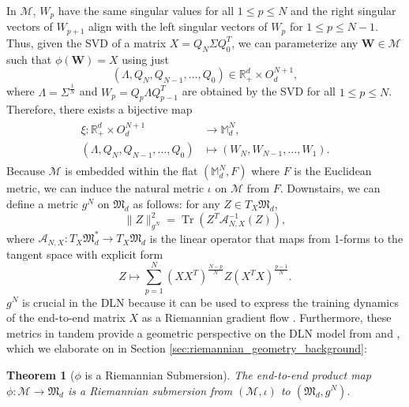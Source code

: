 \documentclass{amsart}
\DeclareMathOperator{\Tr}{Tr}
\newtheorem{theorem}{Theorem}[section]
\theoremstyle{definition}
\theoremstyle{remark}
\numberwithin{equation}{section}
\begin{document}
In $\mathcal{M}$, $W_p$ have the same singular values for all $1 \leq p \leq N$ and the right singular vectors of $W_{p+1}$ align with the left singular vectors of $W_{p}$ for $1 \leq p \leq N-1$. Thus, given the SVD of a matrix $X = Q_N\Sigma Q_0^T$, we can parameterize any $\mathbf{W} \in \mathcal{M}$ such that $\phi(\mathbf{W}) = X$ using just 
\begin{equation}
    (\Lambda, Q_N, Q_{N-1}, \ldots, Q_0) \in \mathbb{R}_+^d\times O_d^{N + 1},
\end{equation}
where $\Lambda = \Sigma^\frac{1}{N}$ and $W_p = Q_{p}\Lambda Q_{p-1}^T$ are obtained by the SVD for all $1 \leq p \leq N$. Therefore, there exists a bijective map 
\begin{align}\label{eq:xi_parameterization}
\begin{split}
    \xi: \mathbb{R}^d_{+} \times O_d^{N+1} &\to \mathbb{M}_d^N, \\
    (\Lambda, Q_N, Q_{N-1}, \ldots, Q_{0}) &\mapsto (W_N, W_{N-1}, \ldots, W_1).
\end{split}
\end{align}
Because $\mathcal{M}$ is embedded within the flat $(\mathbb{M}_d^N,F)$ where $F$ is the Euclidean metric, we can induce the natural metric $\iota$ on $\mathcal{M}$ from $F$. Downstairs, we can define a metric $g^N$ on $\mathfrak{M}_d$ as follows: for any $Z \in T_X\mathfrak{M}_d$,
\begin{equation}
    \|Z\|_{g^N}^2 = \Tr\left(Z^T\mathcal{A}_{N,X}^{-1}(Z)\right),
\end{equation}
where $\mathcal{A}_{N,X}: T_X\mathfrak{M}_d^* \to T_X\mathfrak{M}_d$ is the linear operator that maps from 1-forms to the tangent space with explicit form
\begin{equation}
    Z \mapsto \sum_{p=1}^N\left(XX^T\right)^\frac{N-p}{N}Z\left(X^TX\right)^\frac{p-1}{N}.
\end{equation}
$g^N$ is crucial in the DLN because it can be used to express the training dynamics of the end-to-end matrix $X$ as a Riemannian gradient flow \cite[Section 4]{bah2022learning}. Furthermore, these metrics in tandem provide a geometric perspective on the DLN model from \cite[Theorem 8]{menon2025entropy} and \cite[Theorem 36]{tianmin2024}, which we elaborate on in Section \ref{sec:riemannian_geometry_background}:
\begin{theorem}[$\phi$ is a Riemannian Submersion]\label{thm:phi_is_submersion}
    The end-to-end product map $\phi: \mathcal{M} \to \mathfrak{M}_d$ is a Riemannian submersion from $(\mathcal{M}, \iota)$ to $(\mathfrak{M}_d, g^N)$. 
\end{theorem}
\end{document}
